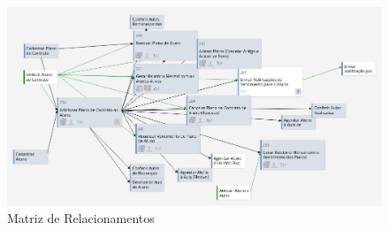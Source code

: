 \begin{figure}[!htb]
    \centering
    \includegraphics[width=\textwidth]{figuras/matriz_relacionamentos.jpeg}
    \caption{Matriz de Relacionamentos}
    \label{fig:matriz_relacionamentos}
\end{figure}
